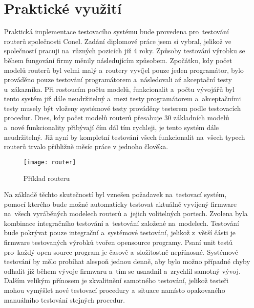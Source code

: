 \section{Praktické využití}
Praktická implementace testovacího systému bude provedena pro~testování routerů společnosti Conel. Zadání diplomové práce jsem si vybral, jelikož ve společností pracuji na~různých pozicích již 4 roky. Způsoby testování výrobku se během fungování firmy měnily následujícím způsobem. Zpočátku, kdy počet modelů routerů byl velmi malý a~routery vyvíjel pouze jeden programátor, bylo prováděno pouze testování programátorem a~následovali až akceptační testy u~zákazníka. Při rostoucím počtu modelů, funkcionalit a~počtu vývojářů byl tento systém již dále neudržitelný a~mezi testy programátorem a~akceptačními testy musely být vloženy systémové testy prováděny testerem podle testovacích procedur. Dnes, kdy počet modelů routerů přesahuje 30 základních modelů a~nové funkcionality  přibývají čím dál tím rychleji, je tento systém dále neudržitelný. Již nyní by kompletní testování všech funkcionalit na~všech typech routerů trvalo přibližně měsíc práce v jednoho člověka.

\begin{figure}[h]
	\centering
	\texttt{[image: router]}
	\caption{Příklad routeru}
	\label{fig:router}
\end{figure}

Na základě těchto skutečností byl vznešen požadavek na~testovací systém, pomocí kterého bude možné automaticky testovat aktuálně vyvíjený firmware na~všech vyráběných modelech routerů a~jejich volitelných portech. Zvolena byla kombinace integračního testování a~testování založené na~modelech. Testování bude pokrývat pouze integrační a~systémové testování, jelikož z~větší části je firmware testovaných výrobků tvořen opensource programy. Psaní unit testů pro~každý open source program je časově a~složitostně nepřínosné. Systémové testování by mělo probíhat alespoň jednou denně, aby bylo možno případné chyby odhalit již během vývoje firmwaru a~tím se usnadnil a~zrychlil samotný vývoj. Dalším velikým přínosem je zkvalitnění samotného testování, jelikož testeři mohou vymýšlet nové testovací procedury a~situace namísto opakovaného manuálního testování stejných procedur.

